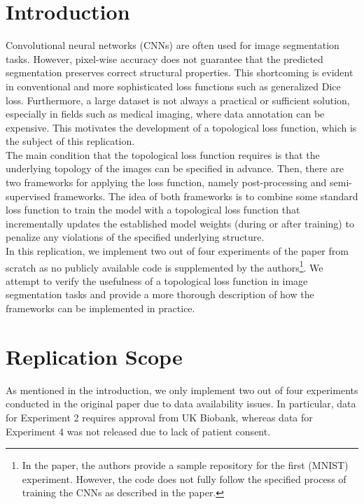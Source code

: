 \section{Introduction}

Convolutional neural networks (CNNs) are often used for image segmentation tasks. However, pixel-wise accuracy does not guarantee that the predicted segmentation preserves correct structural properties. This shortcoming is evident in conventional and more sophisticated loss functions such as generalized Dice loss\supercite{Sudre:2017}. Furthermore, a large dataset is not always a practical or sufficient solution, especially in fields such as medical imaging, where data annotation can be expensive. This motivates the development of a topological loss function\supercite{Clough:2022}, which is the subject of this replication. \\

The main condition that the topological loss function requires is that the underlying topology of the images can be specified in advance. Then, there are two frameworks for applying the loss function, namely post-processing and semi-supervised frameworks. The idea of both frameworks is to combine some standard loss function to train the model with a topological loss function that incrementally updates the established model weights (during or after training) to penalize any violations of the specified underlying structure. \\

In this replication, we implement two out of four experiments of the paper from scratch as no publicly available code is supplemented by the authors\footnote{In the paper, the authors provide a sample repository for the first (MNIST) experiment\supercite{Repo_mnist}. However, the code does not fully follow the specified process of training the CNNs as described in the paper.}. We attempt to verify the usefulness of a topological loss function in image segmentation tasks and provide a more thorough description of how the frameworks can be implemented in practice.

\section{Replication Scope}

As mentioned in the introduction, we only implement two out of four experiments conducted in the original paper due to data availability issues. In particular, data for Experiment 2 requires approval from UK Biobank\supercite{UK_Biobank}, whereas data for Experiment 4 was not released due to lack of patient consent\supercite{Clough:2022}. \\

